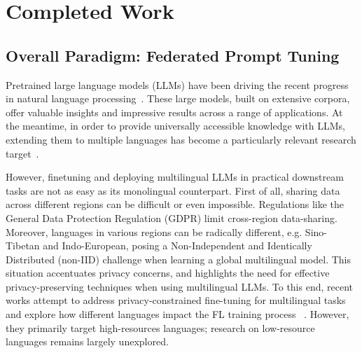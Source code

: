 \documentclass[withindex,glossary,firstyr]{cam-thesis}
\begin{document}
\chapter{Completed Work} \label{YearOne}



\section{Overall Paradigm: Federated Prompt Tuning}

Pretrained large language models (LLMs) have been driving the recent progress in natural language processing~\citep{brown2020language,chowdhery2022palm,anil2023palm,touvron2023llama,touvron2023llama2}. These large models, built on extensive corpora, offer valuable insights and impressive results across a range of applications. At the meantime, in order to provide universally accessible knowledge with LLMs, extending them to multiple languages has become a particularly relevant research target~\citep{XLM,XLM-R,artetxe-etal-2020-cross,pfeiffer-etal-2020-mad}. 

However, finetuning and deploying multilingual LLMs in practical downstream tasks are not as easy as its monolingual counterpart. First of all, sharing data across different regions can be difficult or even impossible. Regulations like the General Data Protection Regulation (GDPR) \cite{lim2020federated} limit cross-region data-sharing. Moreover, languages in various regions can be radically different, e.g. Sino-Tibetan and Indo-European, posing a Non-Independent and Identically Distributed (non-IID) challenge when learning a global multilingual model.
%
%
This situation accentuates privacy concerns, and highlights the need for effective privacy-preserving techniques when using multilingual LLMs. 
%
To this end, recent works attempt to address privacy-constrained fine-tuning for multilingual tasks and explore how different languages impact the FL training process ~\cite{Weller2022PretrainedMF}. 
%
However, they primarily target high-resources languages; research on low-resource languages remains largely unexplored.
\end{document}
